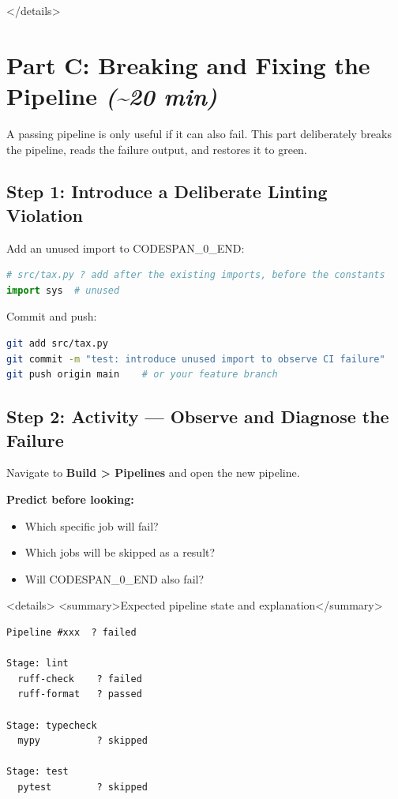 \documentclass[11pt,a4paper]{book}
\begin{document}
</details>

\medskip

\section{Part C: Breaking and Fixing the Pipeline \textit{(\textasciitilde{}20 min)}}

A passing pipeline is only useful if it can also fail. This part deliberately breaks the pipeline, reads the failure output, and restores it to green.

\subsection{Step 1: Introduce a Deliberate Linting Violation}

Add an unused import to CODESPAN\_0\_END:

\begin{lstlisting}[language=Python]
# src/tax.py ? add after the existing imports, before the constants
import sys  # unused
\end{lstlisting}

Commit and push:

\begin{lstlisting}[language=Bash]
git add src/tax.py
git commit -m "test: introduce unused import to observe CI failure"
git push origin main    # or your feature branch
\end{lstlisting}

\medskip

\subsection{Step 2: Activity --- Observe and Diagnose the Failure}

Navigate to \textbf{Build > Pipelines} and open the new pipeline.

\textbf{Predict before looking:}
\begin{itemize}
  \item Which specific job will fail?
  \item Which jobs will be skipped as a result?
  \item Will CODESPAN\_0\_END also fail?
\end{itemize}

<details>
<summary>Expected pipeline state and explanation</summary>

\begin{lstlisting}
Pipeline #xxx  ? failed

Stage: lint
  ruff-check    ? failed
  ruff-format   ? passed

Stage: typecheck
  mypy          ? skipped

Stage: test
  pytest        ? skipped
\end{lstlisting}
\end{document}
